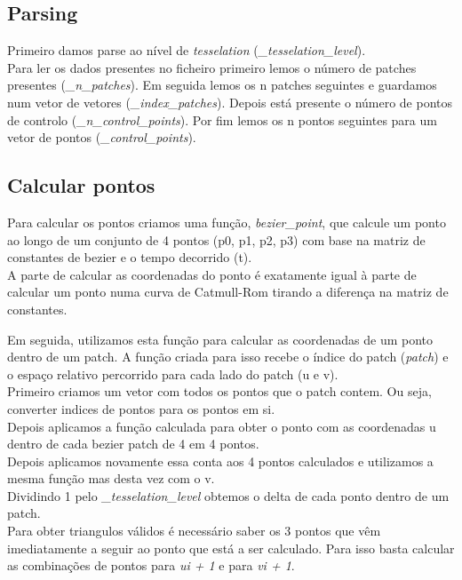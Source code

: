 \documentclass[a4paper]{report}
\begin{document}
\subsection{Parsing}
Primeiro damos parse ao nível de \textit{tesselation}
(\textit{\_tesselation\_level}).\\
Para ler os dados presentes no ficheiro primeiro lemos o número de patches
presentes (\textit{\_n\_patches}). Em seguida lemos os n patches seguintes e
guardamos num vetor de vetores (\textit{\_index\_patches}). Depois está presente
o número de pontos de controlo (\textit{\_n\_control\_points}). Por fim lemos os
n pontos seguintes para um vetor de pontos (\textit{\_control\_points}).

\subsection{Calcular pontos}
Para calcular os pontos criamos uma função, \textit{bezier\_point}, que calcule
um ponto ao longo de um conjunto de 4 pontos (p0, p1, p2, p3) com base na matriz
de constantes de bezier e o tempo decorrido (t).\\
A parte de calcular as coordenadas do ponto é exatamente igual à parte de
calcular um ponto numa curva de Catmull-Rom tirando a diferença na matriz de
constantes.


Em seguida, utilizamos esta função para calcular as coordenadas de um ponto
dentro de um patch. A função criada para isso recebe o índice do patch
(\textit{patch}) e o espaço relativo percorrido para cada lado do patch (u e
v).\\
Primeiro criamos um vetor com todos os pontos que o patch contem. Ou seja,
converter indices de pontos para os pontos em si.\\
Depois aplicamos a função calculada para obter o ponto com as coordenadas u
dentro de cada bezier patch de 4 em 4 pontos.\\
Depois aplicamos novamente essa conta aos 4 pontos calculados e utilizamos a
mesma função mas desta vez com o v.\\


Dividindo 1 pelo \textit{\_tesselation\_level} obtemos o delta de cada ponto
dentro de um patch.\\
Para obter triangulos válidos é necessário saber os 3 pontos que vêm
imediatamente a seguir ao ponto que está a ser calculado. Para isso basta
calcular as combinações de pontos para \textit{ui + 1} e para \textit{vi + 1}.

\end{document}
